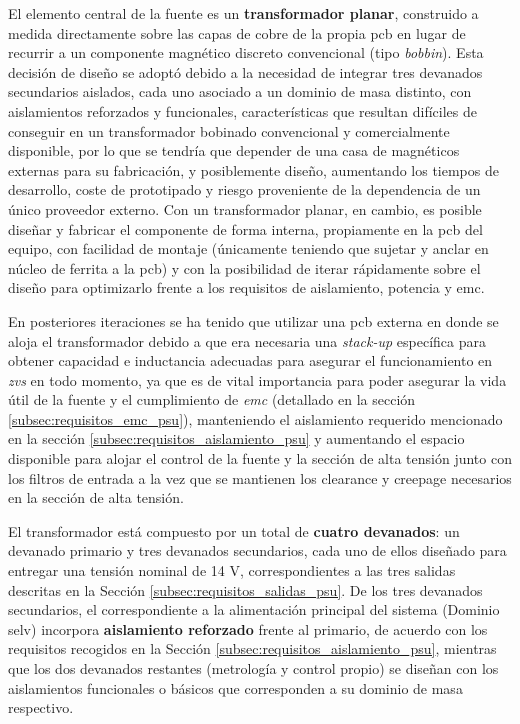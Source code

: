 El elemento central de la fuente es un \textbf{transformador planar}, construido a medida directamente sobre las capas de cobre de la propia \gls{pcb} en lugar de recurrir a un componente magnético discreto convencional (tipo \textit{bobbin}). Esta decisión de diseño se adoptó debido a la necesidad de integrar tres devanados secundarios aislados, cada uno asociado a un dominio de masa distinto, con aislamientos reforzados y funcionales, características que resultan difíciles de conseguir en un transformador bobinado convencional y comercialmente disponible, por lo que se tendría que depender de una casa de magnéticos externas para su fabricación, y posiblemente diseño, aumentando los tiempos de desarrollo, coste de prototipado y riesgo proveniente de la dependencia de un único proveedor externo. Con un transformador planar, en cambio, es posible diseñar y fabricar el componente de forma interna, propiamente en la \gls{pcb} del equipo, con facilidad de montaje (únicamente teniendo que sujetar y anclar en núcleo de ferrita a la \gls{pcb}) y con la posibilidad de iterar rápidamente sobre el diseño para optimizarlo frente a los requisitos de aislamiento, potencia y \gls{emc}.

En posteriores iteraciones se ha tenido que utilizar una \gls{pcb} externa en donde se aloja el transformador debido a que era necesaria una \textit{stack-up} específica para obtener capacidad e inductancia adecuadas para asegurar el funcionamiento en \textit{\gls{zvs}} en todo momento, ya que es de vital importancia para poder asegurar la vida útil de la fuente y el cumplimiento de \textit{\gls{emc}} (detallado en la sección \ref{subsec:requisitos_emc_psu}), manteniendo el aislamiento requerido mencionado en la sección \ref{subsec:requisitos_aislamiento_psu} y aumentando el espacio disponible para alojar el control de la fuente y la sección de alta tensión junto con los filtros de entrada a la vez que se mantienen los \gls{clearance} y \gls{creepage} necesarios en la sección de alta tensión.

El transformador está compuesto por un total de \textbf{cuatro devanados}: un devanado primario y tres devanados secundarios, cada uno de ellos diseñado para entregar una tensión nominal de 14 V, correspondientes a las tres salidas descritas en la Sección \ref{subsec:requisitos_salidas_psu}. De los tres devanados secundarios, el correspondiente a la alimentación principal del sistema (Dominio \gls{selv}) incorpora \textbf{aislamiento reforzado} frente al primario, de acuerdo con los requisitos recogidos en la Sección \ref{subsec:requisitos_aislamiento_psu}, mientras que los dos devanados restantes (metrología y control propio) se diseñan con los aislamientos funcionales o básicos que corresponden a su dominio de masa respectivo.

